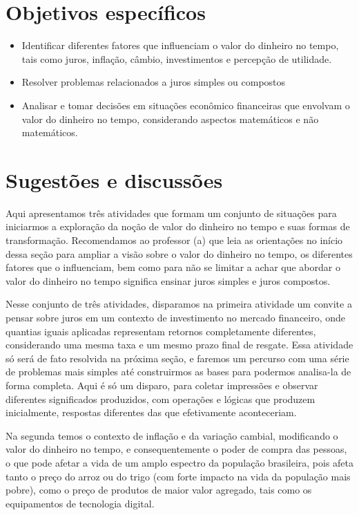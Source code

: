 \begin{texto}
{\def\currentcolor{session1}
\section{Objetivos específicos}
\begin{itemize}
\item Identificar diferentes fatores que influenciam o valor do dinheiro no tempo, tais como juros, inflação, câmbio, investimentos e percepção de utilidade.
\item Resolver problemas relacionados a juros simples ou compostos
\item Analisar e tomar decisões em situações econômico financeiras que envolvam o valor do dinheiro no tempo, considerando aspectos matemáticos e não matemáticos.
\end{itemize}

\section{Sugestões e discussões}

Aqui apresentamos três atividades que formam um conjunto de situações para iniciarmos a exploração da noção de valor do dinheiro no tempo e suas formas de transformação.
Recomendamos ao professor (a) que leia as orientações no início dessa seção para ampliar a visão sobre o valor do dinheiro no tempo, os diferentes fatores que o influenciam, bem como para não se limitar a achar que abordar o valor do dinheiro no tempo significa ensinar juros simples e juros compostos. 

Nesse conjunto de três atividades, disparamos na primeira atividade um convite a pensar sobre juros em um contexto de investimento no mercado financeiro, onde quantias iguais aplicadas representam retornos completamente diferentes, considerando uma mesma taxa e um mesmo prazo final de resgate. Essa atividade só será de fato resolvida na próxima seção, e faremos um percurso com uma série de problemas mais simples até construirmos as bases para podermos analisa-la de forma completa. Aqui é só um disparo, para coletar impressões e observar diferentes significados produzidos, com operações e lógicas que produzem inicialmente, respostas diferentes das que efetivamente aconteceriam.

Na segunda temos o contexto de inflação e da variação cambial, modificando o valor do dinheiro no tempo, e consequentemente o poder de compra das pessoas, o que pode afetar a vida de um amplo espectro da população brasileira, pois afeta tanto o preço do arroz ou do trigo (com forte impacto na vida da população mais pobre), como o preço de produtos de maior valor agregado, tais como os equipamentos de tecnologia digital.

}
\end{texto}
